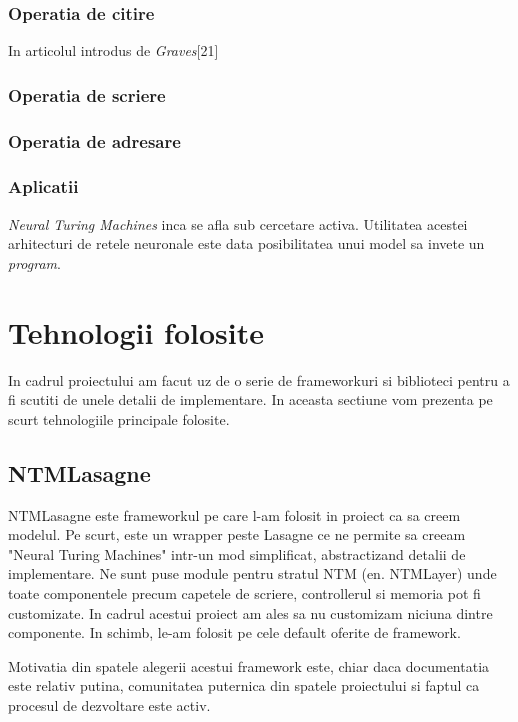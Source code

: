 \documentclass[12pt]{article}
\begin{document}
\subsubsection{Operatia de citire}
In articolul introdus de \textit{Graves}[21]


\subsubsection{Operatia de scriere}



\subsubsection{Operatia de adresare}



\subsubsection{Aplicatii}

\textit{Neural Turing Machines} inca se afla sub cercetare activa. Utilitatea acestei arhitecturi de retele neuronale este data posibilitatea unui model sa invete un \textit{program}. 

\section{Tehnologii folosite}

In cadrul proiectului am facut uz de o serie de frameworkuri si biblioteci pentru a fi scutiti de unele detalii de implementare. In aceasta sectiune vom prezenta pe scurt tehnologiile principale folosite.

\subsection{NTMLasagne}

NTMLasagne este frameworkul pe care l-am folosit in proiect ca sa creem modelul. Pe scurt, este un wrapper peste Lasagne  ce ne permite sa creeam "Neural Turing Machines" intr-un mod simplificat, abstractizand detalii de implementare. Ne sunt puse module pentru stratul NTM (en. NTMLayer) unde toate componentele precum capetele de scriere, controllerul si memoria pot fi customizate. In cadrul acestui proiect am ales sa nu customizam niciuna dintre componente. In schimb, le-am folosit pe cele default oferite de framework.

Motivatia din spatele alegerii acestui framework este, chiar daca documentatia este relativ putina, comunitatea puternica din spatele proiectului si faptul ca procesul de dezvoltare este activ.
\end{document}
